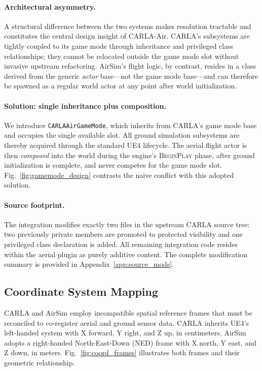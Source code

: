 \paragraph{Architectural asymmetry.}
A structural difference between the two systems makes resolution tractable and
constitutes the central design insight of CARLA-Air.
CARLA's subsystems are tightly coupled to its game mode through inheritance and
privileged class relationships; they cannot be relocated outside the game mode
slot without invasive upstream refactoring.
AirSim's flight logic, by contrast, resides in a class derived from the
generic \emph{actor} base---not the game mode base---and can therefore be
spawned as a regular world actor at any point after world initialization.

\paragraph{Solution: single inheritance plus composition.}
We introduce \texttt{CARLAAirGameMode}, which inherits from CARLA's game mode
base and occupies the single available slot.
All ground simulation subsystems are thereby acquired through the standard UE4
lifecycle.
The aerial flight actor is then \emph{composed} into the world during the
engine's \textsc{BeginPlay} phase, after ground initialization is complete, and
never competes for the game mode slot.
Fig.~\ref{fig:gamemode_design} contrasts the naive conflict with this adopted
solution.



\paragraph{Source footprint.}
The integration modifies exactly two files in the upstream CARLA source tree:
two previously private members are promoted to protected visibility and one
privileged class declaration is added.
All remaining integration code resides within the aerial plugin as purely
additive content.
The complete modification summary is provided in Appendix~\ref{app:source_mods}.

\subsection{Coordinate System Mapping}
\label{sec:arch:coords}

CARLA and AirSim employ incompatible spatial reference frames that must be
reconciled to co-register aerial and ground sensor data.
CARLA inherits UE4's left-handed system with X forward, Y right, and Z up, in
centimeters.
AirSim adopts a right-handed North-East-Down (NED) frame with X north, Y east,
and Z down, in meters.
Fig.~\ref{fig:coord_frames} illustrates both frames and their geometric
relationship.

